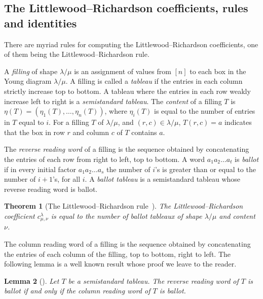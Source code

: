 \documentclass[10pt]{article}
\newtheorem{theorem}{Theorem}[section]
\newtheorem{lemma}[theorem]{Lemma}
\theoremstyle{definition}
\begin{document}
\subsection{The Littlewood--Richardson coefficients, rules and identities}\label{subsec:LRrule}

There are myriad rules for computing the Littlewood--Richardson coefficients, one of them being the Littlewood--Richardson rule.

A \emph{filling} of shape $\lambda / \mu$ is an assignment of values from $[n]$ to each box in the Young diagram $\lambda / \mu$. A filling is called a \emph{tableau} if the entries in each column strictly increase top to bottom. A tableau where the entries in each row weakly increase left to right is a \emph{semistandard tableau}. The \emph{content} of a filling $T$ is $\eta(T) = (\eta_1(T), \ldots, \eta_n(T))$, where $\eta_i(T)$ is equal to the number of entries in $T$ equal to $i$. For a filling $T$ of $\lambda / \mu$, and $(r,c) \in \lambda / \mu$, $T(r,c)=a$ indicates that the box in row $r$ and column $c$ of $T$ contains $a$.

The \emph{reverse reading word} of a filling is the sequence obtained by concatenating the entries of each row from right to left, top to bottom. A word $a_1 a_2 \ldots a_t$ is \emph{ballot} if in every initial factor $a_1 a_2 \ldots a_s$ the number of $i$'s is greater than or equal to the number of $i+1$'s, for all $i$. A \emph{ballot tableau} is a semistandard tableau whose reverse reading word is ballot.

\begin{theorem}[The Littlewood--Richardson rule~\cite{LR34,S99}] 
\label{theorem:lrrule}
The Littlewood--Richardson coefficient $c_{\mu, \nu}^{\lambda}$ is equal to the number of ballot tableaux of shape $\lambda / \mu$ and content $\nu$.
\end{theorem}

The column reading word of a filling is the sequence obtained by concatenating the entries of each column of the filling, top to bottom, right to left. The following lemma is a well known result whose proof we leave to the reader.

\begin{lemma}[\cite{FG93}]
\label{lemma:readingwordequiv}
Let $T$ be a semistandard tableau. The reverse reading word of $T$ is ballot if and only if the column reading word of $T$ is ballot.
\end{lemma}
\end{document}
